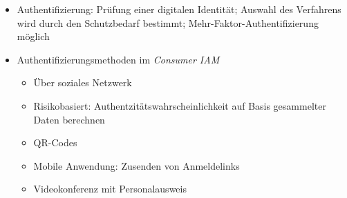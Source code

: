 \begin{itemize}
\begin{itemize}
		\item Authentifizierung: Prüfung einer digitalen Identität; Auswahl des Verfahrens wird durch den Schutzbedarf bestimmt; Mehr-Faktor-Authentifizierung möglich
		\item Authentifizierungsmethoden im \textit{Consumer IAM}
		\begin{itemize}
			\item Über soziales Netzwerk
			\item Risikobasiert: Authentzitätswahrscheinlichkeit auf Basis gesammelter Daten berechnen
			\item QR-Codes
			\item Mobile Anwendung: Zusenden von Anmeldelinks
			\item Videokonferenz mit Personalausweis
		\end{itemize}
	\end{itemize}
\end{itemize}
